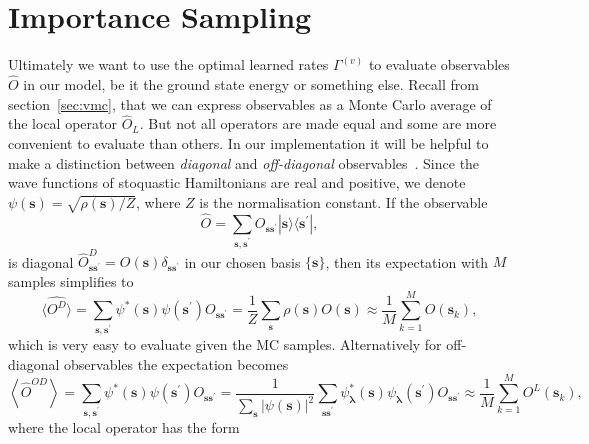 \section{Importance Sampling}
\label{sec:Impl-MCIP}
Ultimately we want to use the optimal learned rates $\Gamma^{(v)}$ to evaluate observables $\hat O$ in our model, be it the ground state energy or something else. Recall from section~\ref{sec:vmc}, that we can express observables as a Monte Carlo average of the local operator $\hat O_L$. But not all operators are made equal and some are more convenient to evaluate than others. In our implementation it will be helpful to make a distinction between \emph{diagonal} and \emph{off-diagonal} observables~\cite{torlai2018neural}. Since the wave functions of stoquastic Hamiltonians are real and positive, we denote $\psi(\boldsymbol{s}) = \sqrt{\rho(\boldsymbol{s})/Z}$, where $Z$ is the normalisation constant. If the observable
\begin{equation}
	\hat {O}=\sum_{\boldsymbol{s}, \boldsymbol{s}^{\prime}} {O}_{\boldsymbol{s} \boldsymbol{s}^{\prime}}|\boldsymbol{s}\rangle \langle \boldsymbol{s}^{\prime}|,
\end{equation}
is diagonal $\hat{O}_{\boldsymbol{s} \boldsymbol{s}^{\prime}}^{D}={O}(\boldsymbol{s}) \delta_{\boldsymbol{s} \boldsymbol{s}^{\prime}}$ in our chosen basis $\{\boldsymbol{s}\}$, then its expectation with $M$ samples simplifies to 
\begin{equation}
	\langle\hat{O^D}\rangle=\sum_{\boldsymbol{s}, \boldsymbol{s}^{\prime}} \psi^*(\boldsymbol{s}) \psi(\boldsymbol{s}^{\prime}) {O}_{\boldsymbol{s} \boldsymbol{s}^{\prime}} = \frac{1}{Z} \sum_{\boldsymbol{s}} \rho(\boldsymbol{s}) O({\boldsymbol{s}})  \approx \frac{1}{M} \sum_{k=1}^{M} O(\boldsymbol{s}_{k}),
\end{equation}
which is very easy to evaluate given the MC samples. Alternatively for off-diagonal observables the expectation becomes
\begin{equation}
	\left\langle\hat{O}^{OD}\right\rangle=\sum_{\boldsymbol{s}, \boldsymbol{s}^{\prime}} \psi^{*}(\boldsymbol{s}) \psi(\boldsymbol{s}^{\prime}) O_{\boldsymbol{s} \boldsymbol{s}^{\prime}} = \frac{1}{\sum_{\boldsymbol{s}}\left|\psi(\boldsymbol{s})\right|^{2}} \sum_{\boldsymbol{s} \boldsymbol{s}^{\prime}} \psi_{\boldsymbol{\lambda}}^{*}(\boldsymbol{s}) \psi_{\boldsymbol{\lambda}}(\boldsymbol{s}^{\prime}) O_{\boldsymbol{s} \boldsymbol{s}^{\prime}} \approx \frac{1}{M} \sum_{k=1}^{M} O^L(\boldsymbol{s}_{k}),
\end{equation}
where the local operator has the form
